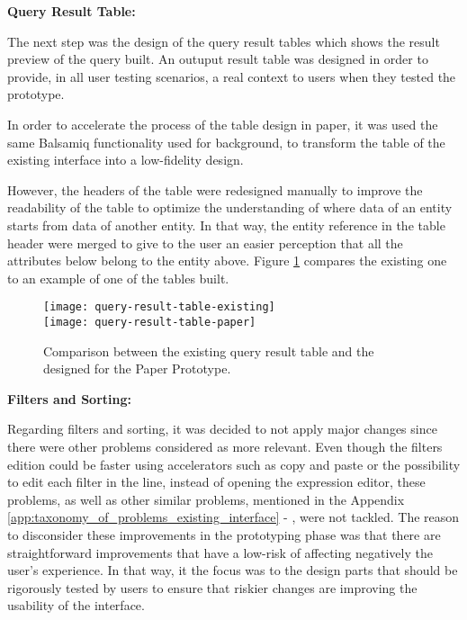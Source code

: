 \medskip

\textbf{Query Result Table:}

\medskip

The next step was the design of the query result tables which shows the result preview of the query built. An outuput result table was designed in order to provide, in all user testing scenarios, a real context to users when they tested the prototype.

In order to accelerate the process of the table design in paper, it was used the same Balsamiq functionality used for background, to transform the table of the existing interface into a low-fidelity design.

However, the headers of the table were redesigned manually to improve the readability of the table to optimize the understanding of where data of an entity starts from data of another entity. In that way, the entity reference in the table header were merged to give to the user an easier perception that all the attributes below belong to the entity above. Figure \ref{fig:queryResultTableComparison} compares the existing one to an example of one of the tables built.

\begin{figure}[tb]
  \centering
    {\texttt{[image: query-result-table-existing]}}%
    \\
  {\texttt{[image: query-result-table-paper]}}%
\caption{Comparison between the existing query result table and the designed for the Paper Prototype.}
  \label{fig:queryResultTableComparison}
\end{figure}

\medskip

\textbf{Filters and Sorting: }

\medskip

Regarding filters and sorting, it was decided to not apply major changes since there were other problems considered as more relevant. Even though the filters edition could be faster using accelerators such as copy and paste or the possibility to edit each filter in the line, instead of opening the expression editor, these problems, as well as other similar problems, mentioned in the Appendix \ref{app:taxonomy_of_problems_existing_interface} - , were not tackled. The reason to disconsider these improvements in the prototyping phase was that there are straightforward improvements that have a low-risk of affecting negatively the user's experience. In that way, it the focus was to the design parts that should be rigorously tested by users to ensure that riskier changes are improving the usability of the interface.

